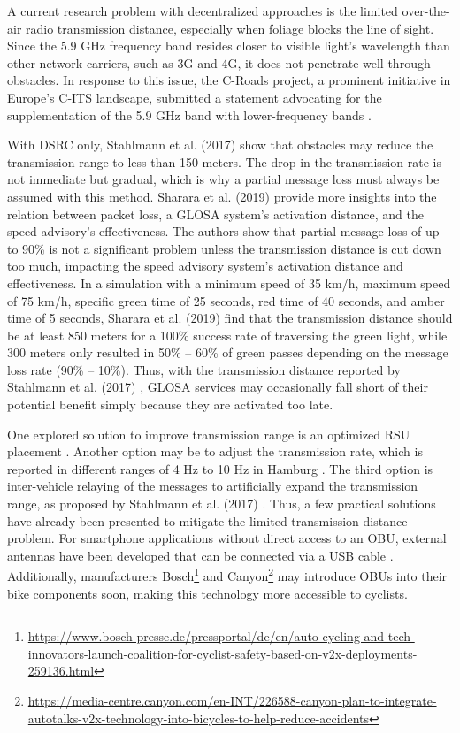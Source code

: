 A current research problem with decentralized approaches is the limited over-the-air radio transmission distance, especially when foliage blocks the line of sight. Since the 5.9 GHz frequency band resides closer to visible light's wavelength than other network carriers, such as 3G and 4G, it does not penetrate well through obstacles. In response to this issue, the C-Roads project, a prominent initiative in Europe's C-ITS landscape, submitted a statement advocating for the supplementation of the 5.9 GHz band with lower-frequency bands \cite{bohm_radio_2017}.

With DSRC only, Stahlmann et al. (2017) \cite{stahlmann_multi-hop_2017} show that obstacles may reduce the transmission range to less than 150 meters. The drop in the transmission rate is not immediate but gradual, which is why a partial message loss must always be assumed with this method. Sharara et al. (2019) \cite{sharara_impact_2019} provide more insights into the relation between packet loss, a GLOSA system's activation distance, and the speed advisory's effectiveness. The authors show that partial message loss of up to 90\% is not a significant problem unless the transmission distance is cut down too much, impacting the speed advisory system's activation distance and effectiveness. In a simulation with a minimum speed of 35 km/h, maximum speed of 75 km/h, specific green time of 25 seconds, red time of 40 seconds, and amber time of 5 seconds, Sharara et al. (2019) \cite{sharara_impact_2019} find that the transmission distance should be at least 850 meters for a 100\% success rate of traversing the green light, while 300 meters only resulted in 50\% -- 60\% of green passes depending on the message loss rate (90\% -- 10\%). Thus, with the transmission distance reported by Stahlmann et al. (2017) \cite{stahlmann_multi-hop_2017}, GLOSA services may occasionally fall short of their potential benefit simply because they are activated too late.

One explored solution to improve transmission range is an optimized RSU placement \cite{mehar_optimized_2015, massobrio_smart_2015, al-ezaly_optimal_2020}. Another option may be to adjust the transmission rate, which is reported in different ranges of 4 Hz \cite{stahlmann_multi-hop_2017} to 10 Hz in Hamburg \cite{stegen_ideas_2021}. The third option is inter-vehicle relaying of the messages to artificially expand the transmission range, as proposed by Stahlmann et al. (2017) \cite{stahlmann_multi-hop_2017}. Thus, a few practical solutions have already been presented to mitigate the limited transmission distance problem. For smartphone applications without direct access to an OBU, external antennas have been developed that can be connected via a USB cable \cite{kim_vulnerable_2017}. Additionally, manufacturers Bosch\footnote{\url{https://www.bosch-presse.de/pressportal/de/en/auto-cycling-and-tech-innovators-launch-coalition-for-cyclist-safety-based-on-v2x-deployments-259136.html}} and Canyon\footnote{\url{https://media-centre.canyon.com/en-INT/226588-canyon-plan-to-integrate-autotalks-v2x-technology-into-bicycles-to-help-reduce-accidents}} may introduce OBUs into their bike components soon, making this technology more accessible to cyclists.

